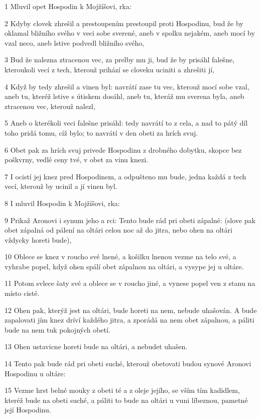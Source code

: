 \par 1 Mluvil opet Hospodin k Mojžíšovi, rka:
\par 2 Kdyby clovek zhrešil a prestoupením prestoupil proti Hospodinu, bud že by oklamal bližního svého v veci sobe sverené, aneb v spolku nejakém, aneb mocí by vzal neco, aneb lstive podvedl bližního svého,
\par 3 Bud že nalezna ztracenou vec, za prelby mu ji, bud že by prisáhl falešne, kteroukoli vecí z tech, kterouž prihází se cloveku uciniti a zhrešiti jí,
\par 4 Když by tedy zhrešil a vinen byl: navrátí zase tu vec, kterouž mocí sobe vzal, aneb tu, kteréž lstive s útiskem dosáhl, aneb tu, kteráž mu sverena byla, aneb ztracenou vec, kterouž nalezl,
\par 5 Aneb o kterékoli veci falešne prisáhl: tedy navrátí to z cela, a nad to pátý díl toho pridá tomu, cíž bylo; to navrátí v den obeti za hrích svuj.
\par 6 Obet pak za hrích svuj privede Hospodinu z drobného dobytku, skopce bez poškvrny, vedlé ceny tvé, v obet za vinu knezi.
\par 7 I ocistí jej knez pred Hospodinem, a odpušteno mu bude, jedna každá z tech vecí, kterouž by ucinil a jí vinen byl.
\par 8 I mluvil Hospodin k Mojžíšovi, rka:
\par 9 Prikaž Aronovi i synum jeho a rci: Tento bude rád pri obeti zápalné: (slove pak obet zápalná od pálení na oltári celou noc až do jitra, nebo ohen na oltári vždycky horeti bude),
\par 10 Oblece se knez v roucho své lnené, a košilku lnenou vezme na telo své, a vyhrabe popel, když ohen spálí obet zápalnou na oltári, a vysype jej u oltáre.
\par 11 Potom svlece šaty své a oblece se v roucho jiné, a vynese popel ven z stanu na místo cisté.
\par 12 Ohen pak, kterýž jest na oltári, bude horeti na nem, nebude uhašován. A bude zapalovati jím knez dríví každého jitra, a zporádá na nem obet zápalnou, a páliti bude na nem tuk pokojných obetí.
\par 13 Ohen ustavicne horeti bude na oltári, a nebudet uhašen.
\par 14 Tento pak bude rád pri obeti suché, kterouž obetovati budou synové Aronovi Hospodinu u oltáre:
\par 15 Vezme hrst belné mouky z obeti té a z oleje jejího, se vším tím kadidlem, kteréž bude na obeti suché, a páliti to bude na oltári u vuni líbeznou, pametné její Hospodinu.
